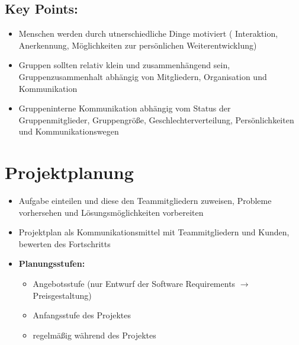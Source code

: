 \subsection{Key Points:} 
\begin{itemize}
    \item Menschen werden durch utnerschiedliche Dinge motiviert ( Interaktion, Anerkennung, Möglichkeiten zur persönlichen Weiterentwicklung)
    \item Gruppen sollten relativ klein und zusammenhängend sein, Gruppenzusammenhalt abhängig von Mitgliedern, Organisation und Kommunikation
    \item Gruppeninterne Kommunikation abhängig vom Status der Gruppenmitglieder, Gruppengröße, Geschlechterverteilung, Persönlichkeiten und Kommunikationswegen
\end{itemize}

\section{Projektplanung} 
\begin{itemize}
    \item Aufgabe einteilen und diese den Teammitgliedern zuweisen, Probleme vorhersehen und Lösungsmöglichkeiten vorbereiten
    \item Projektplan als Kommunikationsmittel mit Teammitgliedern und Kunden, bewerten des Fortschritts
    \item \textbf{Planungsstufen:}
    \begin{itemize}
        \item Angebotsstufe (nur Entwurf der Software Requirements $\rightarrow$ Preisgestaltung)
        \item Anfangsstufe des Projektes
        \item regelmäßig während des Projektes
    \end{itemize}
\end{itemize}


